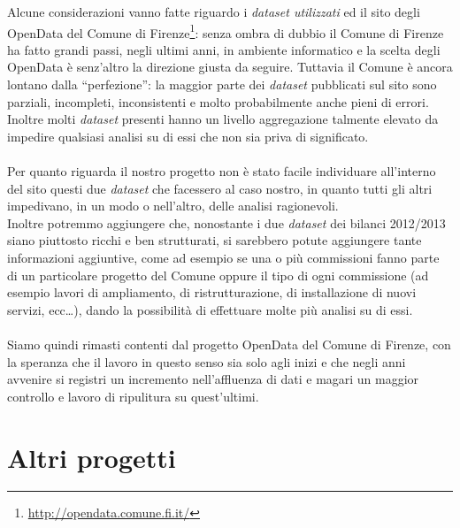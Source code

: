 		Alcune considerazioni vanno fatte riguardo i \textit{dataset utilizzati} ed il sito degli OpenData del Comune di Firenze\footnote{\url{http://opendata.comune.fi.it/}}: senza ombra di dubbio il Comune di Firenze ha fatto grandi passi, negli ultimi anni, in ambiente informatico e la scelta degli OpenData è senz'altro la direzione giusta da seguire. Tuttavia il Comune è ancora lontano dalla ``perfezione'': la maggior parte dei \textit{dataset} pubblicati sul sito sono parziali, incompleti, inconsistenti e molto probabilmente anche pieni di errori. Inoltre molti \textit{dataset} presenti hanno un livello aggregazione talmente elevato da impedire qualsiasi analisi su di essi che non sia priva di significato.\\
		\\
		Per quanto riguarda il nostro progetto non è stato facile individuare all'interno del sito questi due \textit{dataset} che facessero al caso nostro, in quanto tutti gli altri impedivano, in un modo o nell'altro, delle analisi ragionevoli.\\
		Inoltre potremmo aggiungere che, nonostante i due \textit{dataset} dei bilanci 2012/2013 siano piuttosto ricchi e ben strutturati, si sarebbero potute aggiungere tante informazioni aggiuntive, come ad esempio se una o più commissioni fanno parte di un particolare progetto del Comune oppure il tipo di ogni commissione (ad esempio lavori di ampliamento, di ristrutturazione, di installazione di nuovi servizi, ecc\dots), dando la possibilità di effettuare molte più analisi su di essi.\\
		\\
		Siamo quindi rimasti contenti dal progetto OpenData del Comune di Firenze, con la speranza che il lavoro in questo senso sia solo agli inizi e che negli anni avvenire si registri un incremento nell'affluenza di dati e magari un maggior controllo e lavoro di ripulitura su quest'ultimi.

	\section*{Altri progetti}
	
